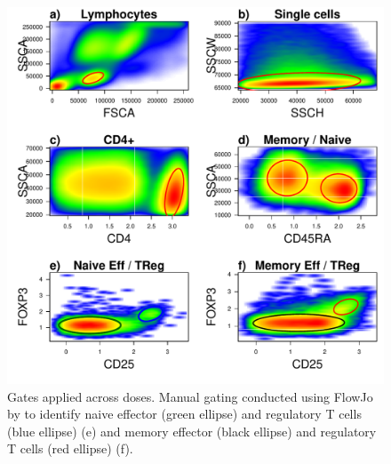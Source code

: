 \begin{figure}[h]
\centering
  \includegraphics[scale=.75]{figures/CB00366X_2012-11-07.pdf}
{Gates applied across doses.}
{
Manual gating conducted using FlowJo by  to identify
naive effector (green ellipse) and regulatory T cells (blue ellipse) (e)
and memory effector (black ellipse) and regulatory T cells (red ellipse) (f).
}
\end{figure}
